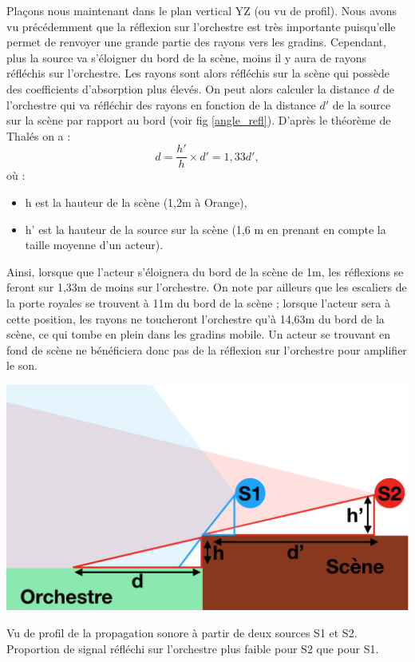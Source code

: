 Plaçons nous maintenant dans le plan vertical YZ (ou vu de profil). Nous avons vu précédemment que la réflexion sur l'orchestre est très importante puisqu'elle permet de renvoyer une grande partie des rayons vers les gradins. Cependant, plus la source va s'éloigner du bord de la scène, moins il y aura de rayons réfléchis sur l'orchestre. Les rayons sont alors réfléchis sur la scène qui possède des coefficients d'absorption plus élevés. On peut alors calculer la distance $d$ de l'orchestre qui va réfléchir des rayons en fonction de la distance $d'$ de la source sur la scène par rapport au bord (voir fig \ref{angle_refl}). D'après le théorème de Thalés on a :
\begin{equation}
d = \frac{h'}{h}\times d' = 1,33d',
\end{equation}
où :
\begin{itemize}
\item h est la hauteur de la scène (1,2m à Orange),
\item h' est la hauteur de la source sur la scène (1,6 m en prenant en compte la taille moyenne d'un acteur).
\end{itemize}
Ainsi, lorsque que l'acteur s'éloignera du bord de la scène de 1m, les réflexions se feront sur 1,33m de moins sur l'orchestre. On note par ailleurs que les escaliers de la porte royales se trouvent à 11m du bord de la scène ; lorsque l'acteur sera à cette position, les rayons ne toucheront l'orchestre qu'à 14,63m du bord de la scène, ce qui tombe en plein dans les gradins mobile. Un acteur se trouvant en fond de scène ne bénéficiera donc pas de la réflexion sur l'orchestre pour amplifier le son.
\begin{figureth}
	\includegraphics[width=0.8\linewidth]{images/angle_refl}
	\caption{Vu de profil de la propagation sonore à partir de deux sources S1 et S2. Proportion de signal réfléchi sur l'orchestre plus faible pour S2 que pour S1.}
	\label{angle_refl}
\end{figureth}


